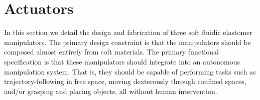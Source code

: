 \section{Actuators}
\label{sec:Actuators}
In this section we detail the design and fabrication of three soft fluidic elastomer manipulators.
%
The primary design constraint is that the manipulators should be composed almost entirely from soft materials.
%
The primary functional specification is that these manipulators should integrate into an autonomous manipulation system.
%
That is, they should be capable of performing tasks such as trajectory-following in free space, moving dexterously through confined spaces, and/or grasping and placing objects, all without human intervention.





